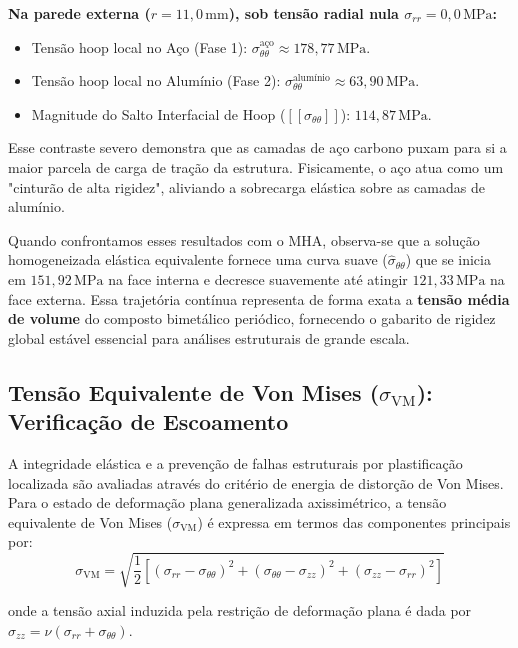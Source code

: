 \textbf{Na parede externa ($r = 11,0 \, \text{mm}$), sob tensão radial nula $\sigma_{rr} = 0,0 \, \text{MPa}$:}
\begin{itemize}
  \item Tensão hoop local no Aço (Fase 1): $\sigma_{\theta\theta}^{\text{aço}} \approx 178,77 \, \text{MPa}$.
  \item Tensão hoop local no Alumínio (Fase 2): $\sigma_{\theta\theta}^{\text{alumínio}} \approx 63,90 \, \text{MPa}$.
  \item Magnitude do Salto Interfacial de Hoop ($[[\sigma_{\theta\theta}]]$): \textbf{$114,87 \, \text{MPa}$}.
\end{itemize}

Esse contraste severo demonstra que as camadas de aço carbono puxam para si a maior parcela de carga de tração da estrutura. Fisicamente, o aço atua como um "cinturão de alta rigidez", aliviando a sobrecarga elástica sobre as camadas de alumínio.

Quando confrontamos esses resultados com o MHA, observa-se que a solução homogeneizada elástica equivalente fornece uma curva suave ($\hat{\sigma}_{\theta\theta}$) que se inicia em $151,92 \, \text{MPa}$ na face interna e decresce suavemente até atingir $121,33 \, \text{MPa}$ na face externa. Essa trajetória contínua representa de forma exata a \textbf{tensão média de volume} do composto bimetálico periódico, fornecendo o gabarito de rigidez global estável essencial para análises estruturais de grande escala.

\subsection{Tensão Equivalente de Von Mises ($\sigma_{\text{VM}}$): Verificação de Escoamento}

A integridade elástica e a prevenção de falhas estruturais por plastificação localizada são avaliadas através do critério de energia de distorção de Von Mises. Para o estado de deformação plana generalizada axissimétrico, a tensão equivalente de Von Mises ($\sigma_{\text{VM}}$) é expressa em termos das componentes principais por:
\begin{equation}
  \sigma_{\text{VM}} = \sqrt{\frac{1}{2} \left[ (\sigma_{rr} - \sigma_{\theta\theta})^2 + (\sigma_{\theta\theta} - \sigma_{zz})^2 + (\sigma_{zz} - \sigma_{rr})^2 \right]}
  \label{eq:von_mises_calc}
\end{equation}

onde a tensão axial induzida pela restrição de deformação plana é dada por $\sigma_{zz} = \nu (\sigma_{rr} + \sigma_{\theta\theta})$.

